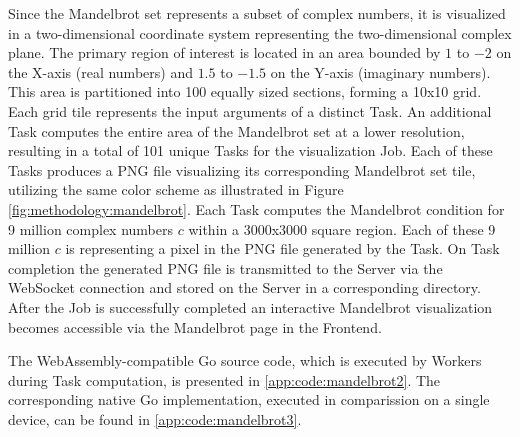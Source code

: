 Since the Mandelbrot set represents a subset of complex numbers, it is visualized in a two-dimensional coordinate system representing the two-dimensional complex plane. The primary region of interest is located in an area bounded by $1$ to $-2$ on the X-axis (real numbers) and $1.5$ to $-1.5$ on the Y-axis (imaginary numbers). This area is partitioned into 100 equally sized sections, forming a 10x10 grid. Each grid tile represents the input arguments of a distinct Task. An additional Task computes the entire area of the Mandelbrot set at a lower resolution, resulting in a total of 101 unique Tasks for the visualization Job. Each of these Tasks produces a \ac{PNG} file visualizing its corresponding Mandelbrot set tile, utilizing the same color scheme as illustrated in Figure \ref{fig:methodology:mandelbrot}. Each Task computes the Mandelbrot condition for 9 million complex numbers $c$ within a 3000x3000 square region. Each of these 9 million $c$ is representing a pixel in the \ac{PNG} file generated by the Task. On Task completion the generated \ac{PNG} file is transmitted to the Server via the WebSocket connection and stored on the Server in a corresponding directory. After the Job is successfully completed an interactive Mandelbrot visualization becomes accessible via the Mandelbrot page in the Frontend.

The WebAssembly-compatible Go source code, which is executed by Workers during Task computation, is presented in \ref{app:code:mandelbrot2}. The corresponding native Go implementation, executed in comparission on a single device, can be found in \ref{app:code:mandelbrot3}.

